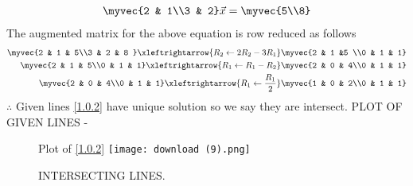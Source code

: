 \documentclass[journal,12pt,twocolumn]{IEEEtran}
\begin{document}
\begin{enumerate}
\begin{align}
\myvec{2 & 1\\3 & 2}
\vec{x} = \myvec{5\\8}
\end{align}
%
The augmented matrix for the above equation is row reduced as follows
\begin{align}
\myvec{2 & 1 & 5\\3 & 2 & 8 }
\xleftrightarrow {R_2\leftarrow 2R_2-3R_1}\myvec{2 & 1 &5 \\0 & 1 & 1}
\\
\myvec{2 & 1 & 5\\0 & 1 & 1}
\xleftrightarrow {R_1\leftarrow
R_1-R_2}\myvec{2 & 0 & 4\\0 & 1 & 1}
\\
\myvec{2 & 0 & 4\\0 & 1 & 1}
\xleftrightarrow{R_1\leftarrow \frac{R_1}{2}}\myvec{1 & 0 & 2\\0 & 1 & 1}
\end{align}
$\therefore$ Given lines \eqref{1.0.2} have unique  solution so we say they are intersect.  
PLOT OF GIVEN LINES -
\begin{figure}[ht]
Plot of \eqref{1.0.2} 
    \centering
   \texttt{[image: download (9).png]}
    \caption{INTERSECTING LINES.}
    \label{fig: INTERSECTING LINES.}
\end{figure}    
\end{enumerate}
\end{document}
